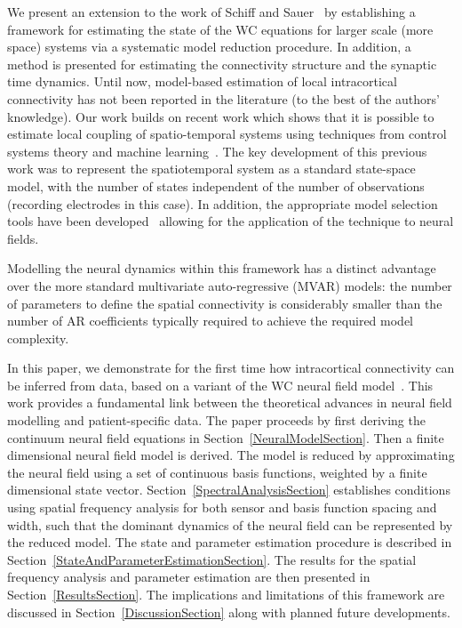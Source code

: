 \documentclass[10pt]{article}
\begin{document}
We present an extension to the work of Schiff and Sauer~\cite{schiff2008kalman} by establishing a framework for estimating the state of the WC equations for larger scale (more space) systems via a systematic model reduction procedure. In addition, a method is presented for estimating the connectivity structure and the synaptic time dynamics. Until now, model-based estimation of local intracortical connectivity has not been reported in the literature (to the best of the authors' knowledge). Our work builds on recent work which shows that it is possible to estimate local coupling of spatio-temporal systems using techniques from control systems theory and machine learning~\cite{Dewar2009}. The key development of this previous work was to represent the spatiotemporal system as a standard state-space model, with the number of states independent of the number of observations (recording electrodes in this case). In addition, the appropriate model selection tools have been developed~\cite{Scerri2009} allowing for the application of the technique to neural fields. 

Modelling the neural dynamics within this framework has a distinct advantage over the more standard multivariate auto-regressive (MVAR) models: the number of parameters to define the spatial connectivity is considerably smaller than the number of AR coefficients typically required to achieve the required model complexity. 

In this paper, we demonstrate for the first time how intracortical connectivity can be inferred from data, based on a variant of the WC neural field model~\cite{Wilson1973}. This work provides a fundamental link between the theoretical advances in neural field modelling and patient-specific data. The paper proceeds by first deriving the continuum neural field equations in Section~\ref{NeuralModelSection}. Then a finite dimensional neural field model is derived. The model is reduced by approximating the neural field using a set of continuous basis functions, weighted by a finite dimensional state vector. Section~\ref{SpectralAnalysisSection} establishes conditions using spatial frequency analysis for both sensor and basis function spacing and width, such that the dominant dynamics of the neural field can be represented by the reduced model. The state and parameter estimation procedure is described in Section~\ref{StateAndParameterEstimationSection}. The results for the spatial frequency analysis and parameter estimation are then presented in Section~\ref{ResultsSection}. The implications and limitations of this framework are discussed in Section~\ref{DiscussionSection} along with planned future developments.
\end{document}
